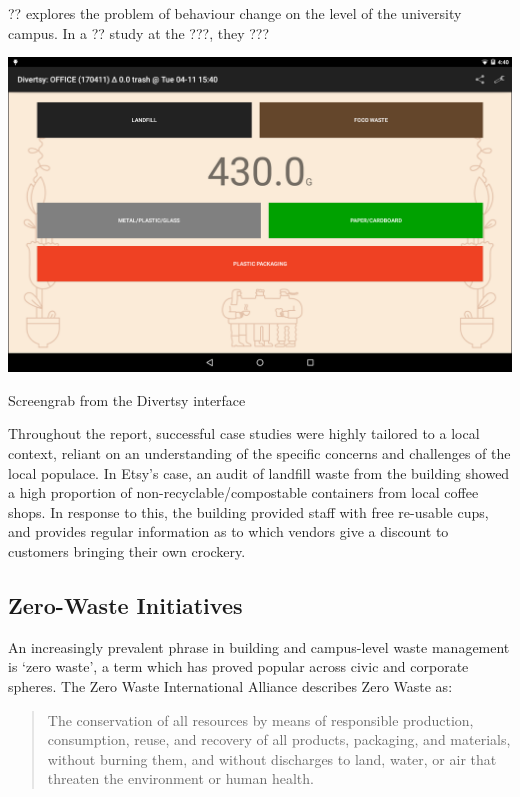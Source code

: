 \documentclass[nofonts,nols,justified,nobib]{tufte-book}
\begin{document}
?? explores the problem of behaviour change on the level of the university campus. In a ?? study at the ???, they ??? 

\begin{marginfigure}
\includegraphics[width=\textwidth]{img/1/divertsy.png}
\caption{Screengrab from the Divertsy interface \cite{benninger_divertsy_2019}}
\end{marginfigure}


Throughout the report, successful case studies were highly tailored to a local context, reliant on an understanding of the specific concerns and challenges of the local populace. In Etsy's case, an audit of landfill waste from the building showed a high proportion of non-recyclable/compostable containers from local coffee shops. In response to this, the building provided staff with free re-usable cups, and provides regular information as to which vendors give a discount to customers bringing their own crockery.


\subsection*{Zero-Waste Initiatives}

An increasingly prevalent phrase in building and campus-level waste management is `zero waste', a term which has proved popular across civic and corporate spheres. The Zero Waste International Alliance describes Zero Waste as:

\begin{quote}
The conservation of all resources by means of responsible production, consumption, reuse, and recovery of all products, packaging, and materials, without burning them, and without discharges to land, water, or air that threaten the environment or human health. 
\cite{zero_waste_international_alliance_zero_2017}
\end{quote}
\end{document}
